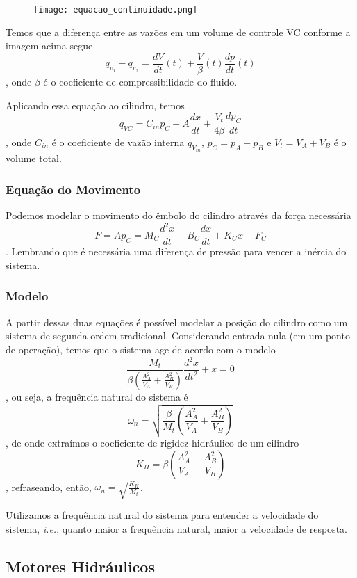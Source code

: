 \documentclass[a4paper]{report}
\begin{document}
\begin{figure}[H]
    \centering
    \texttt{[image: equacao\_continuidade.png]}
\end{figure}

Temos que a diferença entre as vazões em um volume de controle VC conforme a imagem acima segue \[
q_{v_1} - q_{v_2} = \frac{dV}{dt}(t) + \frac{V}{\beta}(t) \frac{dp}{dt}(t)
\], onde $\beta$ é o coeficiente de compressibilidade do fluido.

Aplicando essa equação ao cilindro, temos \[
q_{VC} = C_{in}p_C + A \frac{dx}{dt} + \frac{V_t}{4\beta}\frac{dp_C}{dt}
\], onde $C_{in}$ é o coeficiente de vazão interna $q_{V_{in}}$, $p_C = p_A - p_B$ e $V_t = V_A + V_B$ é o volume total.

\subsubsection*{Equação do Movimento}

Podemos modelar o movimento do êmbolo do cilindro através da força necessária \[
F = Ap_C = M_C \frac{d^2x}{dt} + B_C \frac{dx}{dt} + K_C x + F_C
\]. Lembrando que é necessária uma diferença de pressão para vencer a inércia do sistema.

\subsubsection*{Modelo}

A partir dessas duas equações é possível modelar a posição do cilindro como um sistema de segunda ordem tradicional. Considerando entrada nula (em um ponto de operação), temos que o sistema age de acordo com o modelo \[
    \frac{M_t}{\beta \left( \frac{A_A^2}{V_A} + \frac{A_B^2}{V_B} \right) } \frac{d^2x}{dt^2} + x = 0
\], ou seja, a frequência natural do sistema é \[
\omega_n = \sqrt{\frac{\beta}{M_t} \left( \frac{A_A^2}{V_A} + \frac{A_B^2}{V_B} \right)} 
\], de onde extraímos o coeficiente de rigidez hidráulico de um cilindro \[
K_H = \beta \left( \frac{A_A^2}{V_A} + \frac{A_B^2}{V_B} \right)
\], refraseando, então, $\omega_n = \sqrt{\frac{K_H}{M_t}}$.

Utilizamos a frequência natural do sistema para entender a velocidade do sistema, \emph{i.e.}, quanto maior a frequência natural, maior a velocidade de resposta.

\subsection*{Motores Hidráulicos}
\end{document}
